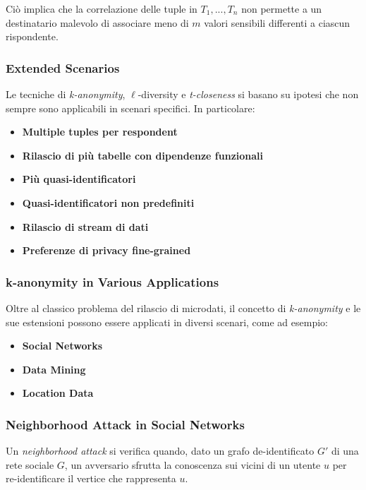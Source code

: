 \documentclass{report}
\begin{document}
\noindent Ciò implica che la correlazione delle tuple in $T_1, ..., T_n$ non permette a un destinatario malevolo di associare meno di $m$ valori sensibili differenti a ciascun rispondente.

\subsubsection{Extended Scenarios}
Le tecniche di \textit{k-anonymity}, $\ell$-diversity e \textit{t-closeness} si basano su ipotesi che non sempre sono applicabili in scenari specifici. In particolare:

\begin{itemize}
    \item \textbf{Multiple tuples per respondent}
    \item \textbf{Rilascio di più tabelle con dipendenze funzionali}
    \item \textbf{Più quasi-identificatori}
    \item \textbf{Quasi-identificatori non predefiniti}
    \item \textbf{Rilascio di stream di dati}
    \item \textbf{Preferenze di privacy fine-grained}
\end{itemize}

\subsubsection{ k-anonymity in Various Applications}
Oltre al classico problema del rilascio di microdati, il concetto di \textit{k-anonymity} e le sue estensioni possono essere applicati in diversi scenari, come ad esempio:

\begin{itemize}
    \item \textbf{Social Networks}
    \item \textbf{Data Mining}
    \item \textbf{Location Data}
\end{itemize}

\subsubsection{ Neighborhood Attack in Social Networks}
Un \textit{neighborhood attack} si verifica quando, dato un grafo de-identificato $G'$ di una rete sociale $G$, un avversario sfrutta la conoscenza sui vicini di un utente $u$ per re-identificare il vertice che rappresenta $u$. 
\end{document}
